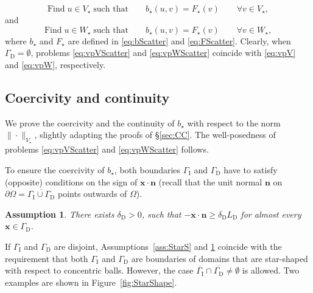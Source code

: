 \documentclass[a4paper]{article}
\theoremstyle{plain}
\newtheorem{assumption}[theorem]{Assumption}
\theoremstyle{definition}
\newcommand{\vect}[1]{\bm{#1}}
\newcommand{\LD}{L_{\mathrm D}}
\newcommand{\Vs}{{V_{\star}}}
\newcommand{\Ws}{{W_{\star}}}
\newcommand{\deltaD}{{\delta_{\mathrm D}}}
\newcommand{\GD}{{\Gamma_{\mathrm D}}}
\newcommand{\GI}{{\Gamma_{\mathrm I}}}
\newcommand{\vx}{{\vect x}}
\newcommand{\vn}{{\vect n}}
\begin{document}
\begin{equation}
	\label{eq:vpVScatter}
	\text{Find}\; u \in \Vs\;\text{such that}\qquad b_\star(u,v) = F_\star(v) \qquad \forall v \in \Vs,
\end{equation}
and
\begin{equation}
	\label{eq:vpWScatter}
	\text{Find}\;u\in\Ws\;\text{such that}\qquad b_\star(u,v) = F_\star(v)\qquad \forall v\in\Ws,
\end{equation}
where $b_\star$ and $F_\star$ are defined in \eqref{eq:bScatter} and \eqref{eq:FScatter}.
Clearly, when $\GD=\emptyset$, problems \eqref{eq:vpVScatter} and \eqref{eq:vpWScatter} coincide with  \eqref{eq:vpV} and \eqref{eq:vpW}, respectively.





\subsection{Coercivity and continuity}
We prove the coercivity and the continuity of $b_\star$ with respect to the norm $\|\cdot\|_\Vs$, slightly adapting the proofs of \S\ref{sec:CC}.
The well-posedness of problems \eqref{eq:vpVScatter} and \eqref{eq:vpWScatter} follows.

To ensure the coercivity of $b_\star$, both boundaries $\GI$ and $\GD$ have to satisfy (opposite) conditions on the sign of $\vx\cdot\vn$ (recall that the unit normal $\vn$ on $\partial\Omega=\overline{\GI\cup\GD}$ points outwards of $\Omega$).
\begin{assumption}\label{ass:StarSD}
There exists $\deltaD > 0$, such that $-\vx\cdot\vn\geq\deltaD\LD$ for almost every $\vx\in\GD$.
\end{assumption}
If $\GI$ and $\GD$ are disjoint, Assumptions~\ref{ass:StarS} and \ref{ass:StarSD} coincide with the requirement that both $\GI$ and $\GD$ are boundaries of domains that are star-shaped with respect to concentric balls.
However, the case $\overline\GI\cap\overline\GD\ne\emptyset$ is allowed.
Two examples are shown in Figure~\ref{fig:StarShape}.
\end{document}
